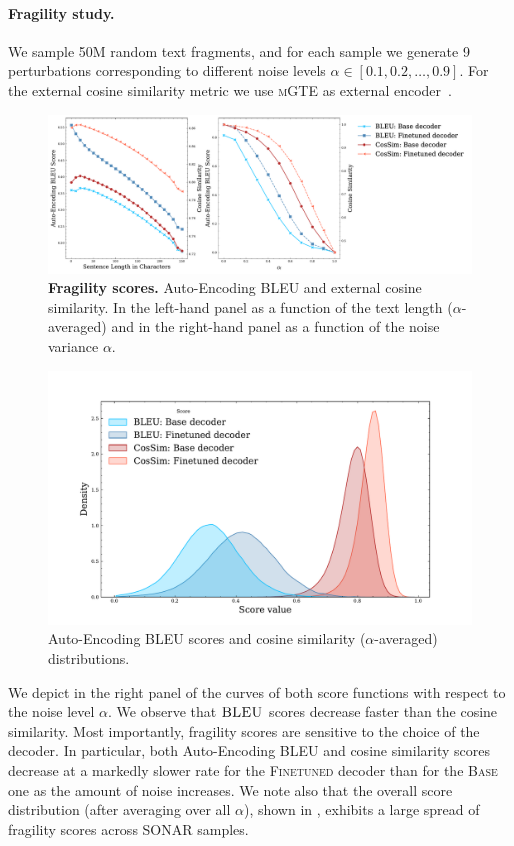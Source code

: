 \documentclass[twoside,11pt]{fairmeta}
\newcommand{\sonar}{\textsc{SONAR}\xspace}
\newcommand{\bleu}{\textsc{BLEU}\xspace}
\begin{document}
\paragraph{Fragility study.}
We sample 50M random text fragments, and for each sample we generate 9 perturbations corresponding to different noise levels $\alpha \in [0.1, 0.2, \ldots, 0.9]$.
For the external cosine similarity metric we use \textsc{mGTE} as external encoder~\citep{zhang2024mgtegeneralizedlongcontexttext}.


\begin{figure}[!htb]
    \centering
    \includegraphics[width=.95\linewidth]{figures/bleu_cossim_alpha_len.pdf}
    \caption{\textbf{Fragility scores.} Auto-Encoding BLEU and external cosine similarity. In the left-hand panel as a function of the text length ($\alpha$-averaged)  and in the right-hand panel as a function of the noise variance $\alpha$.
}
\label{fig:fragility_analysis}
\end{figure}


\begin{figure}[!htb]
    \centering
    \includegraphics[width=.65\linewidth]{figures/blue_cos_dist_kde.pdf}
    \caption{Auto-Encoding BLEU scores and cosine similarity ($\alpha$-averaged) distributions.}
    \label{fig:fragility_analysis_dist}
\end{figure}


We depict in the right panel of  the curves of both score functions with respect to the noise level $\alpha$.
We observe that $\bleu$ scores decrease faster than the cosine similarity.
Most importantly, fragility scores are sensitive to the choice of the decoder. In particular, 
both Auto-Encoding BLEU and cosine similarity scores decrease at a markedly slower rate for the \textsc{Finetuned} decoder than for the \textsc{Base} one as the amount of noise increases.
 We note also that the overall score  distribution (after averaging over all $\alpha$), shown in , exhibits a large spread of fragility scores across \sonar samples.
\end{document}
